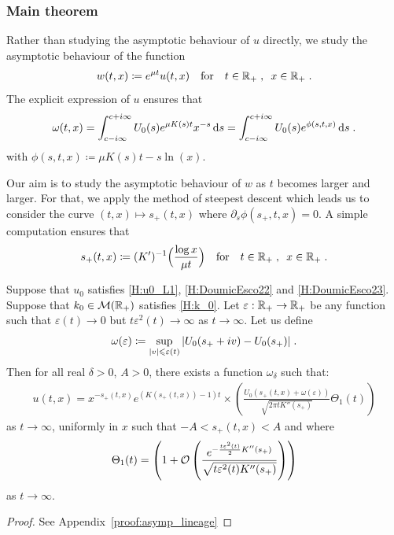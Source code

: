         \subsubsection{Main theorem} 

        Rather than studying the asymptotic behaviour of $u$ directly, we study the asymptotic behaviour of the function 
        \begin{align*}
            w(t,x) \coloneqq e^{\mu t} u(t,x) 
            \quad \text{for} \quad t \in \mathbb{R}_+ \; , \enspace x \in \mathbb{R}_+
            \; .
        \end{align*}
    The explicit expression of $u$ ensures that 
    \begin{equation*}
        \omega(t,x)
        = \int_{c-i\infty}^{c+i\infty} U_0(s) e^{\mu K(s)t}x^{-s} \, \mathrm ds
        =  \int_{c-i\infty}^{c+i\infty} U_0(s) e^{\phi(s, t, x)} \, \mathrm ds
        \; .
    \end{equation*}
with $\phi(s,t,x) \coloneqq \mu K(s) t - s \ln(x) $. 

Our aim is to study the asymptotic behaviour of $w$ as $t$ becomes larger and larger. For that, we apply the method of steepest descent which leads us to consider the curve $(t,x) \mapsto s_+(t,x)$ where $\partial_s \phi(s_+, t,x)= 0$. 
A simple computation ensures that
\begin{align*}
    s_+(t,x) \coloneqq (K')^{-1} \Big( \frac{\log x}{\mu t} \Big)
    \quad \text{for} \quad t \in \mathbb{R}_+ \; , \enspace x \in \mathbb{R}_+
    \; .
\end{align*}


\begin{theorem}\label{t:asymp_lineage}
    Suppose that  $u_0$ satisfies \eqref{H:u0_L1}, \eqref{H:DoumicEsco22} and \eqref{H:DoumicEsco23}. Suppose that $k_0 \in \mathcal{M}(\mathbb{R}_+)$ satisfies \eqref{H:k_0}. 
    Let $\varepsilon : \mathbb{R}_+ \to \mathbb{R}_+$ be any function such that $\varepsilon(t) \to 0$ but $t\varepsilon^2(t) \to \infty$ as $t \to \infty$. 
    Let us define 
    $$\omega(\varepsilon) \coloneqq \sup_{|v| \leqslant \varepsilon(t)} |U_0(s_+ + iv)-U_0(s_+)| \; .$$ 
    Then for all real $\delta > 0$, $A > 0$, there exists a function $\omega_\delta$ such that:
\begin{equation*}
    \begin{split}
    u(t,x) = x^{-s_+(t,x)}e^{(K(s_+(t,x))-1)t} \times 
    \left( \frac{U_0(s_+(t,x)+\omega(\varepsilon))}{\sqrt{2\pi tK''(s_+)}} \Theta_1(t)\right)
    \end{split}
\end{equation*}
as $t\to \infty$, uniformly in $x$ such that $-A < s_+(t,x)< A$ and where 
\begin{align*}
    \Theta_1(t) = \left(1 + \mathcal{O} \left( \frac{e^{-\frac{t\varepsilon^2(t)}{2}K''(s_+)}}{\sqrt{t\varepsilon^2(t)K''(s_+)}} \right) \right)
\end{align*}
as $t \to \infty$. 
\end{theorem}
\begin{proof} See Appendix~\ref{proof:asymp_lineage}
\end{proof}

